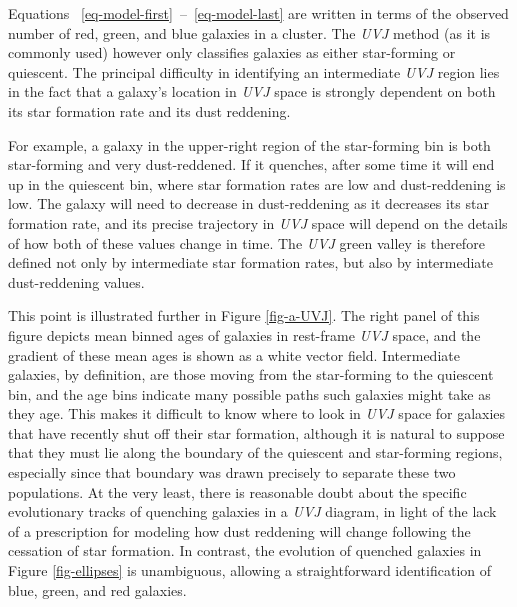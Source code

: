 Equations ~\eqref{eq-model-first}~--~\eqref{eq-model-last} are written in terms of the observed number of red, green, and blue galaxies in a cluster.
The \textit{UVJ} method (as it is commonly used) however only classifies galaxies as either star-forming or quiescent.
The principal difficulty in identifying an intermediate \textit{UVJ} region lies in the fact that a galaxy's location in \textit{UVJ} space is strongly dependent on both its star formation rate and its dust reddening.

For example, a galaxy in the upper-right region of the star-forming bin is both star-forming and very dust-reddened.
If it quenches, after some time it will end up in the quiescent bin, where star formation rates are low and dust-reddening is low.
The galaxy will need to decrease in dust-reddening as it decreases its star formation rate, and its precise trajectory in \textit{UVJ} space will depend on the details of how both of these values change in time.
The \textit{UVJ} green valley is therefore defined not only by intermediate star formation rates, but also by intermediate dust-reddening values.

This point is illustrated further in Figure \ref{fig-a-UVJ}.
The right panel of this figure depicts mean binned ages of galaxies in rest-frame \textit{UVJ} space, and the gradient of these mean ages is shown as a white vector field.
Intermediate galaxies, by definition, are those moving from the star-forming to the quiescent bin, and the age bins indicate many possible paths such galaxies might take as they age.
This makes it difficult to know where to look in \textit{UVJ} space for galaxies that have recently shut off their star formation, although it is natural to suppose that they must lie along the boundary of the quiescent and star-forming regions, especially since that boundary was drawn precisely to separate these two populations.
At the very least, there is reasonable doubt about the specific evolutionary tracks of quenching galaxies in a \textit{UVJ} diagram, in light of the lack of a prescription for modeling how dust reddening will change following the cessation of star formation.
In contrast, the evolution of quenched galaxies in Figure \ref{fig-ellipses} is unambiguous, allowing a straightforward identification of blue, green, and red galaxies.

